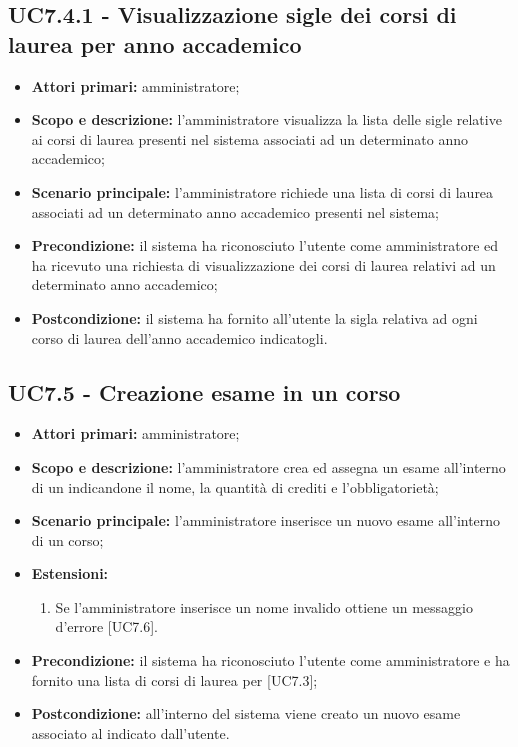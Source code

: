 \documentclass[AnalisiDeiRequisiti.tex]{subfiles}
\begin{document}
\subsection{UC7.4.1 - Visualizzazione sigle dei corsi di laurea per anno accademico}
\begin{itemize}
	\item \textbf{Attori primari:} amministratore;
	\item \textbf{Scopo e descrizione:} l'amministratore visualizza la lista delle sigle relative ai corsi di laurea presenti nel sistema associati ad un determinato anno accademico;
	\item \textbf{Scenario principale:} l'amministratore richiede una lista di corsi di laurea associati ad un determinato anno accademico presenti nel sistema;
	\item \textbf{Precondizione:} il sistema ha riconosciuto l'utente come amministratore ed ha ricevuto una richiesta di visualizzazione dei corsi di laurea relativi ad un determinato anno accademico; 
	\item \textbf{Postcondizione:} il sistema ha fornito all'utente la sigla relativa ad ogni corso di laurea dell'anno accademico indicatogli.
\end{itemize}

\subsection{UC7.5 - Creazione esame in un corso}
\begin{itemize}
	\item \textbf{Attori primari:} amministratore;
	\item \textbf{Scopo e descrizione:} l'amministratore crea ed assegna un esame all'interno di un  indicandone il nome, la quantità di crediti e l'obbligatorietà;
	\item \textbf{Scenario principale:} l'amministratore inserisce un nuovo esame all'interno di un corso;
	\item \textbf{Estensioni:}
	\begin{enumerate}
		\item Se l'amministratore inserisce un nome invalido ottiene un messaggio d'errore [UC7.6].
	\end{enumerate}
	\item \textbf{Precondizione:} il sistema ha riconosciuto l'utente come amministratore e ha fornito una lista di corsi di laurea per  [UC7.3];
	\item \textbf{Postcondizione:} all'interno del sistema viene creato un nuovo esame associato al  indicato dall'utente.
\end{itemize}
\end{document}
